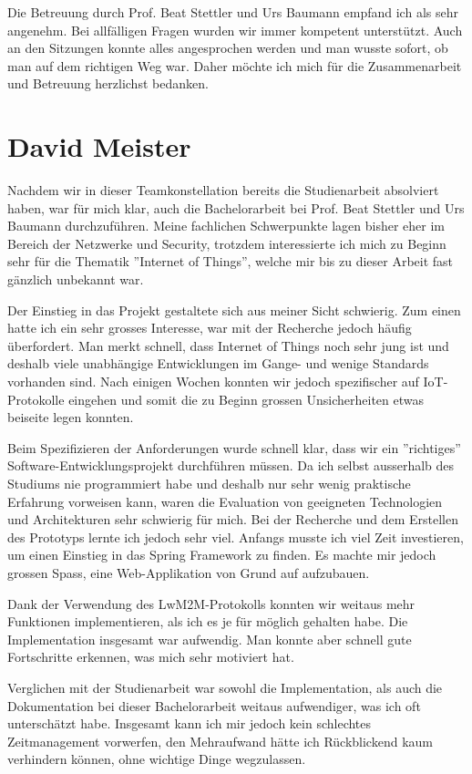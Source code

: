 Die Betreuung durch Prof. Beat Stettler und Urs Baumann empfand ich als sehr angenehm. Bei allfälligen Fragen wurden wir immer kompetent unterstützt. Auch an den Sitzungen konnte alles angesprochen werden und man wusste sofort, ob man auf dem richtigen Weg war. Daher möchte ich mich für die Zusammenarbeit und Betreuung herzlichst bedanken.

\newpage
\section{David Meister}
Nachdem wir in dieser Teamkonstellation bereits die Studienarbeit absolviert haben, war für mich klar, auch die Bachelorarbeit bei Prof. Beat Stettler und Urs Baumann durchzuführen. Meine fachlichen Schwerpunkte lagen bisher eher im Bereich der Netzwerke und Security, trotzdem interessierte ich mich zu Beginn sehr für die Thematik ''Internet of Things'', welche mir bis zu dieser Arbeit fast gänzlich unbekannt war.

Der Einstieg in das Projekt gestaltete sich aus meiner Sicht schwierig. Zum einen hatte ich ein sehr grosses Interesse, war mit der Recherche jedoch häufig überfordert. Man merkt schnell, dass Internet of Things noch sehr jung ist und deshalb viele unabhängige Entwicklungen im Gange- und wenige Standards vorhanden sind. Nach einigen Wochen konnten wir jedoch spezifischer auf IoT-Protokolle eingehen und somit die zu Beginn grossen Unsicherheiten etwas beiseite legen konnten.

Beim Spezifizieren der Anforderungen wurde schnell klar, dass wir ein ''richtiges'' Software-Entwicklungsprojekt durchführen müssen. Da ich selbst ausserhalb des Studiums nie programmiert habe und deshalb nur sehr wenig praktische Erfahrung vorweisen kann, waren die Evaluation von geeigneten Technologien und Architekturen sehr schwierig für mich. Bei der Recherche und dem Erstellen des Prototyps lernte ich jedoch sehr viel. Anfangs musste ich viel Zeit investieren, um einen Einstieg in das Spring Framework zu finden. Es machte mir jedoch grossen Spass, eine Web-Applikation von Grund auf aufzubauen.

Dank der Verwendung des LwM2M-Protokolls konnten wir weitaus mehr Funktionen implementieren, als ich es je für möglich gehalten habe. Die Implementation insgesamt war aufwendig. Man konnte aber schnell gute Fortschritte erkennen, was mich sehr motiviert hat.

Verglichen mit der Studienarbeit war sowohl die Implementation, als auch die Dokumentation bei dieser Bachelorarbeit weitaus aufwendiger, was ich oft unterschätzt habe. Insgesamt kann ich mir jedoch kein schlechtes Zeitmanagement vorwerfen, den Mehraufwand hätte ich Rückblickend kaum verhindern können, ohne wichtige Dinge wegzulassen.

